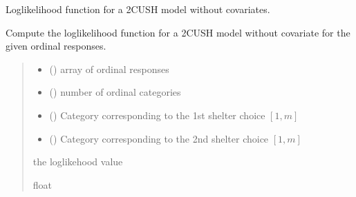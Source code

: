 \documentclass[letterpaper,10pt,english]{sphinxmanual}
\begin{document}
\begin{fulllineitems}
\label{\detokenize{cubmods:cubmods.cush2.loglik}}
\pysigstartsignatures
{}
\pysigstopsignatures
\sphinxAtStartPar
Log\sphinxhyphen{}likelihood function for a 2\sphinxhyphen{}CUSH model without covariates.

\sphinxAtStartPar
Compute the log\sphinxhyphen{}likelihood function for a 2\sphinxhyphen{}CUSH model 
without covariate for the given ordinal responses.
\begin{quote}\begin{description}
\begin{itemize}
\item {} 
\sphinxAtStartPar
{} () \textendash{} array of ordinal responses

\item {} 
\sphinxAtStartPar
{} () \textendash{} number of ordinal categories

\item {} 
\sphinxAtStartPar
{} () \textendash{} Category corresponding to the 1st shelter choice \([1,m]\)

\item {} 
\sphinxAtStartPar
{} () \textendash{} Category corresponding to the 2nd shelter choice \([1,m]\)

\end{itemize}

\sphinxAtStartPar
the log\sphinxhyphen{}likehood value

\sphinxAtStartPar
float

\end{description}\end{quote}

\end{fulllineitems}

\end{document}
